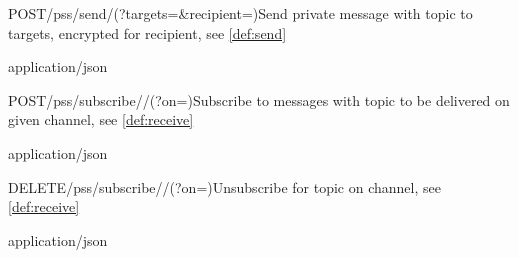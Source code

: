 
\begin{apiRoute}{POST}{/pss/send/(?targets=\&recipient=)}{Send private message with topic to targets, encrypted for recipient, see \ref{def:send}}{
}{ }

\begin{routeParameter} 
\end{routeParameter}
\begin{queryParameter} 
\end{queryParameter} 
\begin{headerParameter} 
\end{headerParameter}
\begin{routeResponse}{application/json}
\end{routeResponse}
\end{apiRoute}




\begin{apiRoute}{POST}{/pss/subscribe//(?on=)}{Subscribe to messages with topic to be delivered on given channel, see \ref{def:receive}}{
}{ }

\begin{routeParameter} 
\end{routeParameter}
\begin{queryParameter} 
\end{queryParameter} \begin{routeResponse}{application/json}
\end{routeResponse}
\end{apiRoute}

 
\begin{apiRoute}{DELETE}{/pss/subscribe//(?on=)}{Unsubscribe for topic on channel, see \ref{def:receive}}{
}{ }

\begin{routeParameter} 
\end{routeParameter}
\begin{queryParameter} 
\end{queryParameter} \begin{headerParameter} 
\end{headerParameter}
\begin{routeResponse}{application/json}
\end{routeResponse}
\end{apiRoute}